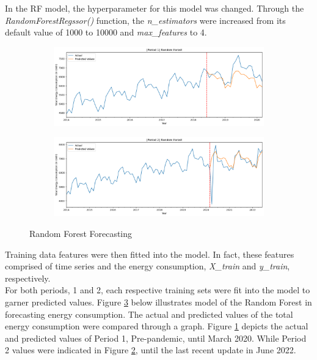\documentclass[runningheads]{llncs}
\begin{document}
In the RF model, the hyperparameter for this model was changed. Through the \textit{RandomForestRegssor()} function, the \textit{n\_estimators} were increased from its default value of 1000 to 10000 and \textit{max\_features} to 4. 
\begin{figure}[h]
    \begin{subfigure}[h]{\textwidth}
         \centering
         \includegraphics[width=\textwidth]{rf/p1-RF.png}
         \caption{}
         \label{fig:modelRF-p1}
    \end{subfigure}
    \begin{subfigure}[h]{\textwidth}
         \centering
         \includegraphics[width=\textwidth]{rf/p2-RF.png}
         \caption{}
         \label{fig:modelRF-p2}
    \end{subfigure}
    \caption{Random Forest Forecasting}
    \label{fig:fig1}
\end{figure}
Training data features were then fitted into the model. In fact, these features comprised of time series and the energy consumption, \textit{X\_train} and \textit{y\_train}, respectively.\\

For both periods, 1 and 2, each respective training sets were fit into the model to garner predicted values. Figure \ref{fig:fig1} below illustrates model of the Random Forest in forecasting energy consumption. The actual and predicted values of the total energy consumption were compared through a graph. Figure \ref{fig:modelRF-p1} depicts the actual and predicted values of Period 1, Pre-pandemic, until March 2020. While Period 2 values were indicated in Figure \ref{fig:modelRF-p2}, until the last recent update in June 2022.
\end{document}
